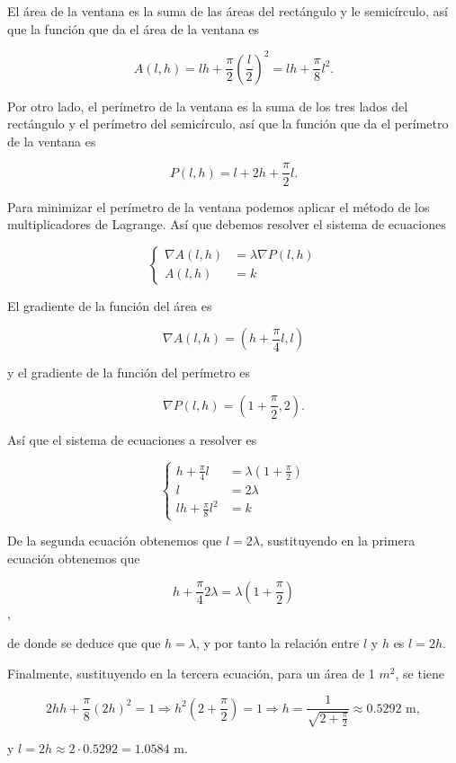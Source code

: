 \documentclass[
  a4paper,
]{scrreport}
\theoremstyle{definition}
\theoremstyle{remark}
\begin{document}
\begin{tcolorbox}[enhanced jigsaw, colback=white, toprule=.15mm, coltitle=black, left=2mm, breakable, toptitle=1mm, title=\textcolor{quarto-callout-tip-color}{\faLightbulb}\hspace{0.5em}{Solución}, opacitybacktitle=0.6, leftrule=.75mm, bottomrule=.15mm, titlerule=0mm, arc=.35mm, opacityback=0, colframe=quarto-callout-tip-color-frame, colbacktitle=quarto-callout-tip-color!10!white, bottomtitle=1mm, rightrule=.15mm]

El área de la ventana es la suma de las áreas del rectángulo y le
semicírculo, así que la función que da el área de la ventana es

\[
A(l,h)=lh+\frac{\pi}{2}\left(\frac{l}{2}\right)^2 = lh + \frac{\pi}{8}l^2.
\]

Por otro lado, el perímetro de la ventana es la suma de los tres lados
del rectángulo y el perímetro del semicírculo, así que la función que da
el perímetro de la ventana es

\[
P(l,h)=l+2h+\frac{\pi}{2}l.
\]

Para minimizar el perímetro de la ventana podemos aplicar el método de
los multiplicadores de Lagrange. Así que debemos resolver el sistema de
ecuaciones

\[
\begin{cases}
\nabla A(l,h) &= \lambda \nabla P(l,h) \\
A(l,h) &= k
\end{cases}
\]

El gradiente de la función del área es

\[
\nabla A(l,h) = \left( h + \frac{\pi}{4}l,  l\right)
\]

y el gradiente de la función del perímetro es

\[
\nabla P(l,h) = \left( 1 + \frac{\pi}{2}, 2\right).
\]

Así que el sistema de ecuaciones a resolver es

\[
\begin{cases}
h + \frac{\pi}{4}l &= \lambda \left( 1 + \frac{\pi}{2}\right) \\
l &= 2\lambda \\
lh + \frac{\pi}{8}l^2 &= k
\end{cases}
\]

De la segunda ecuación obtenemos que \(l=2\lambda\), sustituyendo en la
primera ecuación obtenemos que

\[
h + \frac{\pi}{4}2\lambda = \lambda \left( 1 + \frac{\pi}{2}\right)
\],

de donde se deduce que que \(h = \lambda\), y por tanto la relación
entre \(l\) y \(h\) es \(l=2h\).

Finalmente, sustituyendo en la tercera ecuación, para un área de 1
\(m^2\), se tiene

\[
2hh + \frac{\pi}{8}(2h)^2 = 1 
\Rightarrow h^2\left( 2 + \frac{\pi}{2}\right) = 1 
\Rightarrow h = \frac{1}{\sqrt{2 + \frac{\pi}{2}}}
\approx 0.5292 \mbox{ m},
\]

y \(l = 2h \approx 2\cdot 0.5292 = 1.0584\) m.

\end{tcolorbox}
\end{document}
